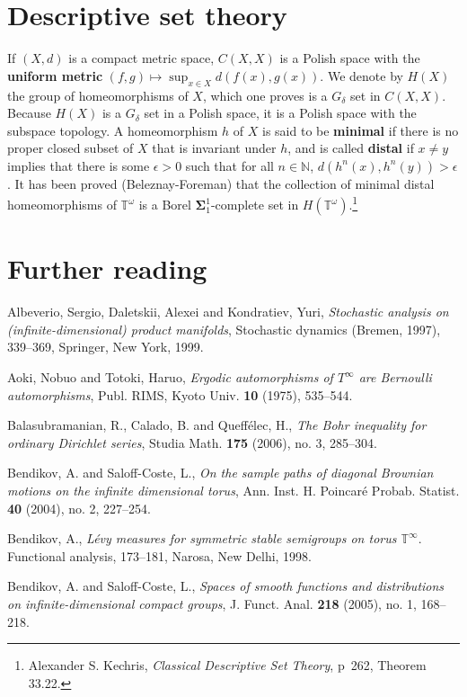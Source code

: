 \documentclass{article}
\begin{document}
\section{Descriptive set theory}
If $(X,d)$ is a compact metric space, 
$C(X,X)$ is a Polish space with the \textbf{uniform metric} $(f,g) \mapsto \sup_{x \in X} d(f(x),g(x))$. 
We denote by $H(X)$ the group of homeomorphisms of $X$, which one proves is a $G_\delta$ set in $C(X,X)$.  
Because $H(X)$ is a $G_\delta$ set in a Polish space, it is a Polish space with the subspace topology. 
A homeomorphism $h$ of $X$ is said to be \textbf{minimal} if there is no proper closed subset of $X$ that is invariant under $h$, and is called
\textbf{distal} if $x \neq y$ implies that there is some $\epsilon>0$ such that for all $n \in \mathbb{N}$, $d(h^n(x),h^n(y))>\epsilon$. 
It has been proved (Beleznay-Foreman) that the collection of minimal distal homeomorphisms of $\mathbb{T}^\omega$ is a Borel $\mathbf{\Sigma}_1^1$-complete
set in $H(\mathbb{T}^\omega)$.\footnote{Alexander S. Kechris, {\em Classical Descriptive Set Theory}, p~262, Theorem 33.22.}



\section{Further reading}
Albeverio, Sergio, Daletskii, Alexei and Kondratiev, Yuri, {\em Stochastic analysis on (infinite-dimensional) product manifolds},
Stochastic dynamics (Bremen, 1997), 339--369, Springer, New York, 1999. 

Aoki, Nobuo and Totoki, Haruo, {\em Ergodic automorphisms of $T^\infty$ are Bernoulli automorphisms},
Publ. RIMS, Kyoto Univ. \textbf{10} (1975), 535--544.

Balasubramanian, R., Calado, B. and Queff\'elec, H.,
{\em The Bohr inequality for ordinary Dirichlet series},
Studia Math. \textbf{175} (2006), no. 3, 285--304. 

Bendikov, A. and Saloff-Coste, L., {\em On the sample paths of diagonal Brownian motions on the infinite dimensional torus},
Ann. Inst. H. Poincar\'e Probab. Statist. \textbf{40} (2004), no. 2, 227--254. 

Bendikov, A., {\em L\'evy measures for symmetric stable semigroups on torus $\mathbb{T}^\infty$}. Functional analysis, 173--181, Narosa, New Delhi, 1998. 

Bendikov, A. and Saloff-Coste, L., {\em Spaces of smooth functions and distributions on infinite-dimensional compact groups}, 
J. Funct. Anal. \textbf{218} (2005), no. 1, 168--218. 
\end{document}
